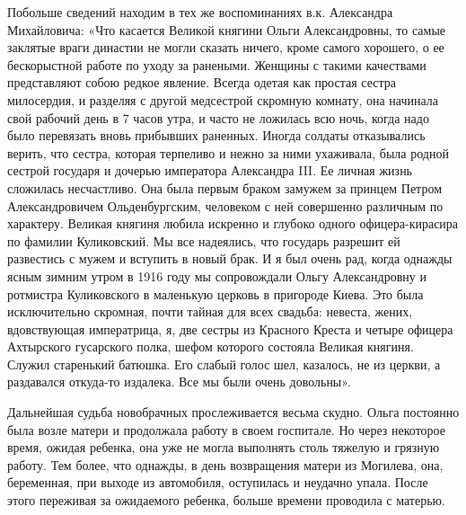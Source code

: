 Побольше
сведений находим в тех же воспоминаниях в.к. Александра Михайловича: «Что
касается Великой княгини Ольги Александровны, то самые заклятые враги династии
не могли сказать ничего, кроме самого хорошего, о ее бескорыстной работе по
уходу за ранеными. Женщины с такими качествами представляют собою редкое
явление. Всегда одетая как простая сестра милосердия, и разделяя с другой
медсестрой скромную комнату, она начинала свой рабочий день в 7 часов утра, и
часто не ложилась всю ночь, когда надо было перевязать вновь прибывших
раненных. Иногда солдаты отказывались верить, что сестра, которая терпеливо и
нежно за ними ухаживала, была родной сестрой государя и дочерью императора
Александра III. Ее личная жизнь сложилась несчастливо. Она была первым браком
замужем за принцем Петром Александровичем Ольденбургским, человеком с ней
совершенно различным по характеру. Великая княгиня любила искренно и глубоко
одного офицера-кирасира по фамилии Куликовский. Мы все надеялись, что государь
разрешит ей развестись с мужем и вступить в новый брак. И я был очень рад,
когда однажды ясным зимним утром в 1916 году мы сопровождали Ольгу
Александровну и ротмистра Куликовского в маленькую церковь в пригороде Киева.
Это была исключительно скромная, почти тайная для всех свадьба: невеста, жених,
вдовствующая императрица, я, две сестры из Красного Креста и четыре офицера
Ахтырского гусарского полка, шефом которого состояла Великая княгиня. Служил
старенький батюшка. Его слабый голос шел, казалось, не из церкви, а раздавался
откуда-то издалека. Все мы были очень довольны».

Дальнейшая судьба новобрачных прослеживается весьма скудно. Ольга постоянно
была возле матери и продолжала работу в своем госпитале. Но через некоторое
время, ожидая ребенка, она уже не могла выполнять столь тяжелую и грязную
работу. Тем более, что однажды, в день возвращения матери из Могилева, она,
беременная, при выходе из автомобиля, оступилась и неудачно упала. После этого
переживая за ожидаемого ребенка, больше времени проводила с матерью.

